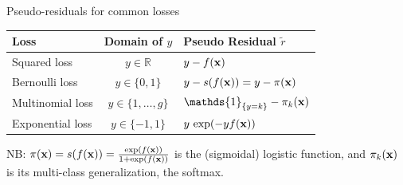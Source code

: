 \documentclass[11pt,compress,t,notes=noshow, xcolor=table]{beamer}
\begin{document}
\begin{vbframe}{Pseudo-residuals for common losses}

\lz

\begin{table}[ht]
\centering
\begin{tabular}{|l|c|l|}
\hline
\textbf{Loss} & \textbf{Domain of $y$} & \textbf{Pseudo Residual $\tilde r$} \\ \hline
Squared loss & $y \in \mathbb{R}$ & $y - f(\mathbf{x})$ \\ \hline
Bernoulli loss & $y \in \{0,1\}$ & $y - s(f(\mathbf{x}))=y-\pi(\mathbf{x})$ \\ \hline
Multinomial loss & $y \in \{1,\dots,g\}$ & $\mathds{1}_{\{y=k\}} - \pi_k(\xv)$ \\ \hline
Exponential loss & $y \in \{-1,1\}$ & $y\,\exp(-yf(\mathbf{x}))$ \\ \hline
\end{tabular}
\end{table}

\lz

NB: $\pi(\mathbf{x})=s(f(\mathbf{x}))=\frac{\exp(f(\mathbf{x}))}{1+\exp(f(\mathbf{x}))}$ is the (sigmoidal) logistic function,
and $\pi_k(\mathbf{x})$ is its multi-class generalization, the softmax.

\end{vbframe}



\endlecture
\end{document}
